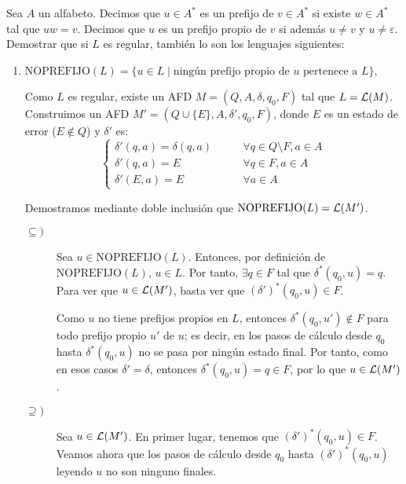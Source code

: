 \begin{ejercicio}
    Sea $A$ un alfabeto. Decimos que $u\in A^*$ es un prefijo de $v\in A^*$ si existe $w\in A^*$ tal que $uw = v$. Decimos que $u$ es un prefijo propio de $v$ si además $u \neq v$ y $u \neq \varepsilon$. Demostrar que si $L$ es regular, también lo son los lenguajes siguientes:
    \begin{enumerate}
        \item $\text{NOPREFIJO}(L) = \{u \in L \mid \text{ningún prefijo propio de } u \text{ pertenece a } L\}$,
        
        Como $L$ es regular, existe un AFD $M=(Q, A, \delta, q_0, F)$ tal que $L=\mathcal{L}(M)$. Construimos un AFD $M'=(Q\cup \{E\}, A, \delta', q_0, F)$,
        donde $E$ es un estado de error ($E\notin Q$) y $\delta'$ es:
        \begin{equation*}
            \begin{cases}
                \delta'(q, a) = \delta(q, a)&\qquad \forall q\in Q\setminus F, a\in A\\
                \delta'(q, a) = E&\qquad \forall q\in F, a\in A\\
                \delta'(E, a) = E&\qquad \forall a\in A
            \end{cases}
        \end{equation*}

        Demostramos mediante doble inclusión que $\text{NOPREFIJO}(L)=\mathcal{L}(M')$.
        \begin{description}
            \item[$\subseteq)$] Sea $u\in \text{NOPREFIJO}(L)$. Entonces, por definición de $\text{NOPREFIJO}(L)$, $u\in L$. Por tanto, $\exists q\in F$ tal que $\delta^{\ast}(q_0, u)=q$. Para ver que $u\in \mathcal{L}(M')$, basta ver que $(\delta')^{\ast}(q_0, u)\in F$.

            Como $u$ no tiene prefijos propios en $L$, entonces $\delta^{\ast}(q_0, u')\notin F$ para todo prefijo propio $u'$ de $u$; es decir, en los pasos de cálculo desde $q_0$ hasta $\delta^{\ast}(q_0, u)$ no se pasa por ningún estado final. Por tanto, como en esos casos $\delta'=\delta$, entonces $\delta^{\ast}(q_0, u)=q\in F$, por lo que $u\in \mathcal{L}(M')$.

            \item[$\supseteq)$] Sea $u\in \mathcal{L}(M')$. En primer lugar, tenemos que $(\delta')^{\ast}(q_0, u)\in F$. Veamos ahora que los pasos de cálculo desde $q_0$ hasta $(\delta')^{\ast}(q_0, u)$ leyendo $u$ no son ninguno finales.
            

\end{description}
\end{enumerate}
\end{ejercicio}
